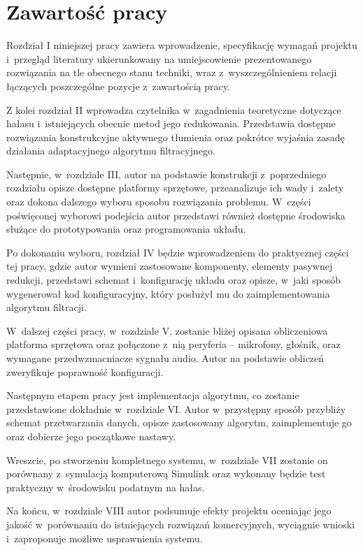 \section{Zawartość pracy}
\label{sec:zawartoscPracy}
Rozdział I niniejszej pracy zawiera wprowadzenie, specyfikację wymagań projektu i~przegląd literatury ukierunkowany na umiejscowienie prezentowanego rozwiązania na tle obecnego stanu techniki, wraz z~wyszczególnieniem relacji łączących poszczególne pozycje z~zawartością pracy.

Z kolei rozdział II wprowadza czytelnika w~zagadnienia teoretyczne dotyczące hałasu i~istniejących obecnie metod jego redukowania. Przedstawia dostępne rozwiązania konstrukcyjne aktywnego tłumienia oraz pokrótce wyjaśnia zasadę działania adaptacyjnego algorytmu filtracyjnego.

Następnie, w~rozdziale III, autor na podstawie konstrukcji z~poprzedniego rozdziału opisze dostępne platformy sprzętowe, przeanalizuje ich wady i~zalety oraz dokona dalszego wyboru sposobu rozwiązania problemu. W~części poświęconej wyborowi podejścia autor przedstawi również dostępne środowiska służące do prototypowania oraz programowania układu.

Po dokonaniu wyboru, rozdział IV będzie wprowadzeniem do praktycznej części tej pracy, gdzie autor wymieni zastosowane komponenty, elementy pasywnej redukcji, przedstawi schemat i~konfigurację układu oraz opisze, w~jaki sposób wygenerował kod konfiguracyjny, który posłużył mu do zaimplementowania algorytmu filtracji.

W~dalszej części pracy, w~rozdziale V, zostanie bliżej opisana obliczeniowa platforma sprzętowa oraz połączone z~nią peryferia -- mikrofony, głośnik, oraz wymagane przedwzmacniacze sygnału audio. Autor na podstawie obliczeń zweryfikuje poprawność konfiguracji.

Następnym etapem pracy jest implementacja algorytmu, co zostanie przedstawione dokładnie w~rozdziale VI. Autor w~przystępny sposób przybliży schemat przetwarzania danych, opisze zastosowany algorytm, zaimplementuje go oraz dobierze jego początkowe nastawy.

Wreszcie, po stworzeniu kompletnego systemu, w~rozdziale VII zostanie on porównany z~symulacją komputerową Simulink oraz wykonany będzie test praktyczny w~środowisku podatnym na hałas.

Na końcu, w~rozdziale VIII autor podsumuje efekty projektu oceniając jego jakość w~porównaniu do istniejących rozwiązań komercyjnych, wyciągnie wnioski i~zaproponuje możliwe usprawnienia systemu.
